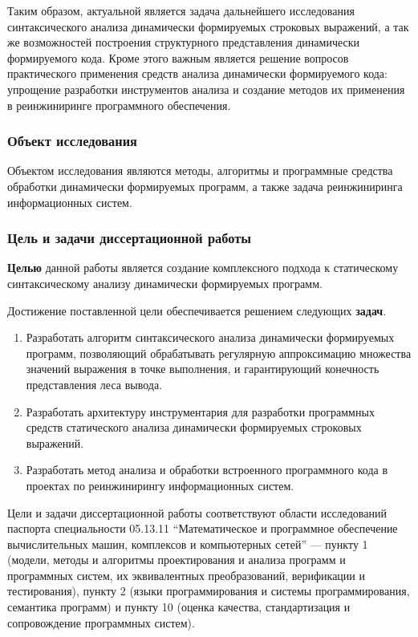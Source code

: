 Таким образом, актуальной является задача дальнейшего исследования синтаксического анализа динамически формируемых строковых выражений, а так же возможностей построения структурного представления динамически формируемого кода. Кроме этого важным является решение вопросов практического применения средств анализа динамически формируемого кода: упрощение разработки инструментов анализа и создание методов их применения в реинжиниринге программного обеспечения.

\subsubsection*{\large{Объект исследования}}

 Объектом исследования являются методы, алгоритмы и программные средства обработки динамически формируемых программ, а также задача реинжиниринга информационных систем.

\subsubsection*{\large{Цель и задачи диссертационной работы}}

\textbf{Целью} данной работы является создание комплексного подхода к статическому синтаксическому анализу динамически формируемых программ.

Достижение поставленной цели обеспечивается решением следующих \textbf{задач}.
\begin{enumerate}
    \item Разработать алгоритм синтаксического анализа динамически формируемых программ, позволяющий обрабатывать регулярную аппроксимацию множества значений выражения в точке выполнения, и гарантирующий конечность представления леса вывода.
    \item Разработать архитектуру инструментария для разработки программных средств статического анализа динамически формируемых строковых выражений.
    \item Разработать метод анализа и обработки встроенного программного кода в проектах по реинжинирингу информационных систем.
\end{enumerate}

Цели и задачи диссертационной работы соответствуют области исследований паспорта специальности 05.13.11 ``Математическое и программное обеспечение вычислительных машин, комплексов и компьютерных сетей'' --- пункту 
1 (модели, методы и алгоритмы проектирования и анализа программ и программных систем, их эквивалентных преобразований, верификации и тестирования),
пункту 2 (языки программирования и системы программирования, семантика программ) и пункту 10 (оценка качества, стандартизация и сопровождение программных систем).


